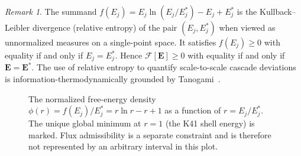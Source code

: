 \documentclass[12pt,a4paper]{article}
\theoremstyle{definition}
\theoremstyle{plain}
\theoremstyle{remark}
\newtheorem{remark}[definition]{Remark}
\begin{document}
\begin{remark}
The summand $f(E_j) = E_j \ln(E_j/E_j^*) - E_j + E_j^*$ is the
Kullback--Leibler divergence (relative entropy) of the pair $(E_j, E_j^*)$
when viewed as unnormalized measures on a single-point space.  It satisfies
$f(E_j) \ge 0$ with equality if and only if $E_j = E_j^*$.  Hence
$\mathcal{F}[\mathbf{E}] \ge 0$ with equality if and only if $\mathbf{E}
= \mathbf{E}^*$. The use of relative entropy to quantify scale-to-scale cascade deviations is information-thermodynamically grounded by Tanogami~\cite{Tanogami2023,Tanogami2025}.
\end{remark}

\begin{figure}[ht]
\centering
{}
\caption{The normalized free-energy density
$\phi(r)=f(E_j)/E_j^*=r\ln r-r+1$ as a function of
$r=E_j/E_j^*$.  The unique global minimum at $r=1$ (the K41 shell
energy) is marked.  Flux admissibility is a separate constraint and is
therefore not represented by an arbitrary interval in this plot.}
\label{fig:FE-landscape}
\end{figure}
\end{document}
